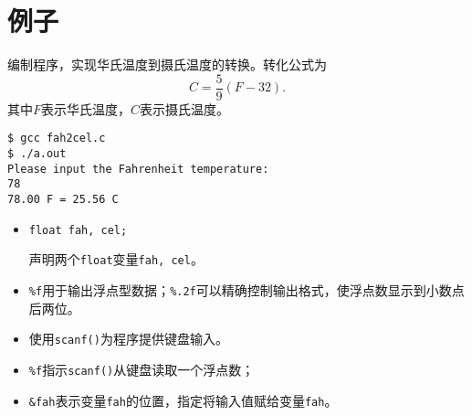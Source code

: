 \section{例子}

\begin{frame}[fragile]\ft{\secname}
  编制程序，实现华氏温度到摄氏温度的转换。转化公式为
  $$
  C = \frac59 (F-32).
  $$
  其中$F$表示华氏温度，$C$表示摄氏温度。
\end{frame}

\begin{frame}[fragile]\ft{\secname}


\end{frame}

\begin{frame}[fragile]\ft{\secname}

\begin{lstlisting}
$ gcc fah2cel.c 
$ ./a.out
Please input the Fahrenheit temperature:
78
78.00 F = 25.56 C
\end{lstlisting}
\end{frame}


\begin{frame}[fragile]\ft{\secname}
\begin{itemize}
\item 
\begin{lstlisting}
float fah, cel;
\end{lstlisting}
声明两个\lstinline|float|变量\lstinline|fah, cel|。\\[0.1in]
\item \lstinline|%f|用于输出浮点型数据；\lstinline|%.2f|可以精确控制输出格式，使浮点数显示到小数点后两位。\\[0.1in]
\item 使用\lstinline|scanf()|为程序提供键盘输入。\\[0.1in]
\item[] \lstinline|%f|指示\lstinline|scanf()|从键盘读取一个浮点数；\\[0.1in]
\item[] \lstinline|&fah|表示变量\lstinline|fah|的位置，指定将输入值赋给变量\lstinline|fah|。

\end{itemize}
\end{frame}


